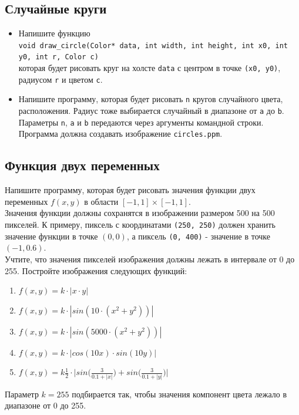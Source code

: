 \documentclass{article}
\begin{document}
\subsection{Случайные круги} 
\begin{itemize}
\item Напишите функцию \\
\texttt{void draw\_circle(Color* data, int width, int height, int x0, int y0, int r, Color c)}\\
которая будет рисовать круг на холсте \texttt{data} с центром в точке \texttt{(x0, y0)}, радиусом \texttt{r} и цветом \texttt{c}.
\item Напишите программу, которая будет рисовать \texttt{n} кругов случайного цвета, расположения. Радиус тоже выбирается случайный в диапазоне от \texttt{a} до \texttt{b}. Параметры \texttt{n}, \texttt{a} и \texttt{b} передаются через аргументы командной строки. Программа должна создавать изображение \texttt{circles.ppm}.
\end{itemize}

\subsection{Функция двух переменных} 
Напишите программу, которая будет рисовать значения функции двух переменных $f(x, y)$ в области $[-1, 1]\times[-1, 1]$.\\
 Значения функции должны сохранятся в изображении размером 500 на 500 пикселей. К примеру, пиксель с координатами \texttt{(250, 250)} должен хранить значение функции в точке $(0, 0)$, а пиксель \texttt{(0, 400)} - значение в точке $(-1, 0.6)$. \\
Учтите, что значения пикселей изображения должны лежать в интервале от 0 до 255. Постройте изображения следующих функций: 
\begin{enumerate}
\item $f(x, y) = k\cdot|x \cdot y|$
\item $f(x, y) = k\cdot|sin(10\cdot(x^2 + y^2))|$
\item $f(x, y) = k\cdot|sin(5000\cdot(x^2 + y^2))|$
\item $f(x, y) = k\cdot|cos(10x)\cdot sin(10y)|$
\item $f(x, y) = k\frac{1}{2}\cdot\Big|sin\Big(\frac{3}{0.1 + |x|}\Big) + sin\Big(\frac{3}{0.1 + |y|}\Big)\Big|$
\end{enumerate}
Параметр $k = 255$ подбирается так, чтобы значения компонент цвета лежало в диапазоне от 0 до 255.
\end{document}
